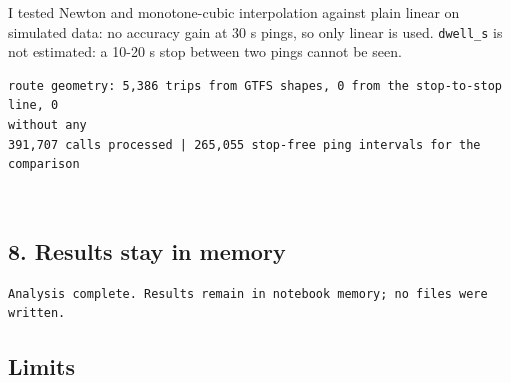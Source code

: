 \documentclass[11pt]{article}
\begin{document}
I tested Newton and monotone-cubic interpolation against plain linear on
simulated data: no accuracy gain at 30 s pings, so only linear is used.
\texttt{dwell\_s} is not estimated: a 10-20 s stop between two pings
cannot be seen.

    \begin{Verbatim}[commandchars=\\\{\}]
route geometry: 5,386 trips from GTFS shapes, 0 from the stop-to-stop line, 0
without any
391,707 calls processed | 265,055 stop-free ping intervals for the comparison
    \end{Verbatim}

    \begin{center}
    \end{center}
    { \hspace*{\fill} \\}
    
    \subsection{8. Results stay in memory}\label{results-stay-in-memory}

    \begin{Verbatim}[commandchars=\\\{\}]
Analysis complete. Results remain in notebook memory; no files were written.
    \end{Verbatim}

    \subsection{Limits}\label{limits}
\end{document}
